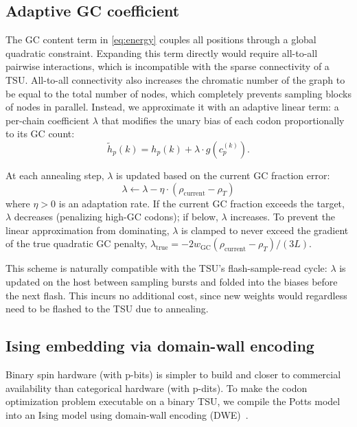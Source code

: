 \documentclass[11pt,twocolumn]{article}
\begin{document}
\subsection{Adaptive GC coefficient}\label{sec:methods_gc}

The GC content term in \cref{eq:energy} couples all positions through a global quadratic constraint.
Expanding this term directly would require all-to-all pairwise interactions, which is incompatible with the sparse connectivity of a TSU. All-to-all connectivity also increases the chromatic number of the graph to be equal to the total number of nodes, which completely prevents sampling blocks of nodes in parallel.
Instead, we approximate it with an adaptive linear term: a per-chain coefficient $\lambda$ that modifies the unary bias of each codon proportionally to its GC count:
\begin{equation}
\tilde{h}_p(k) = h_p(k) + \lambda \cdot g(c_p^{(k)}).
\end{equation}

At each annealing step, $\lambda$ is updated based on the current GC fraction error:
\begin{equation}
\lambda \leftarrow \lambda - \eta \cdot (\rho_\text{current} - \rho_T)
\end{equation}
where $\eta > 0$ is an adaptation rate.
If the current GC fraction exceeds the target, $\lambda$ decreases (penalizing high-GC codons); if below, $\lambda$ increases.
To prevent the linear approximation from dominating, $\lambda$ is clamped to never exceed the gradient of the true quadratic GC penalty, $\lambda_\text{true} = -2 w_\text{GC} (\rho_\text{current} - \rho_T) / (3L)$.

This scheme is naturally compatible with the TSU's flash-sample-read cycle: $\lambda$ is updated on the host between sampling bursts and folded into the biases before the next flash. This incurs no additional cost, since new weights would regardless need to be flashed to the TSU due to annealing.

\subsection{Ising embedding via domain-wall encoding}
\label{sec:methods_ising}

Binary spin hardware (with p-bits) is simpler to build and closer to commercial availability than categorical hardware (with p-dits).
To make the codon optimization problem executable on a binary TSU, we compile the Potts model into an Ising model using domain-wall encoding (DWE)~\cite{chancellor2019dwc, berwald2022dwc, chen2021dwc}.
\end{document}

